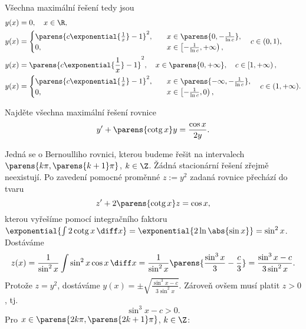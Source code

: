 \documentclass[answers]{exam}
\begin{document}
\begin{questions}
\begin{solution}
  	Všechna maximální řešení tedy jsou
  	\begin{align*}
  		y(x)
  		&=
  		0,
  		\quad x \in \R,
  		\\
  		y(x)
  		&=
  		\begin{cases}
  			\parens{c \exponential{\frac{1}{x}} - 1}^2, &\quad x \in \parens{0, -\frac{1}{\ln c}},
  			\\
  			0, &\quad x \in \left[ -\frac{1}{\ln c}, +\infty \right),
  		\end{cases}
  		\quad c \in (0, 1),
  		\\
  		y(x) 
  		&=
  		\parens{c \exponential{\frac{1}{x}} - 1}^2, \quad x \in \parens{0, +\infty}, \quad c \in \left[ 1, +\infty \right),
  		\\
  		y(x)
  		&=
  		\begin{cases}
  			\parens{c \exponential{\frac{1}{x}} - 1}^2, &\quad x \in \parens{-\infty, -\frac{1}{\ln c}},
  			\\
  			0, &\quad x \in \left[ -\frac{1}{\ln c}, 0 \right),
  		\end{cases}
  		\quad c \in (1, +\infty).
  	\end{align*} 
	\end{solution}
	
  \question
  Najd\v ete v\v sechna maxim\'aln\'i \v re\v sen\'i rovnice
  \begin{equation*}
    y' + \parens{\operatorname{cotg}x}y
    =
    \frac{\cos x}{2 y}.
  \end{equation*}
	    
  \begin{solution}
  	Jedná se o Bernoulliho rovnici, kterou budeme řešit na intervalech $\parens{k\pi, \parens{k+1}\pi}$, $k \in \Z$.  Žádná stacionární řešení zřejmě neexistují. Po zavedení pomocné proměnné $z:=y^2$ zadaná rovnice přechází do tvaru
	 	\begin{equation*}
	 		z'
	 		+
	 		2 \parens{\operatorname{cotg}x} z
	 		=
	 		\cos x,
	 	\end{equation*}
	 	kterou vyřešíme pomocí integračního faktoru $\exponential{\int 2 \operatorname{cotg}x \, \diff x} = \exponential{2 \ln \abs{\sin x}} = \sin^2 x$. Dostáváme
	 	\begin{equation*}
	 		z(x) 
	 		= 
	 		\frac{1}{\sin^2 x} \int \sin^2 x \cos x \, \diff x
	 		=
	 		\frac{1}{\sin^2 x} \parens{ \frac{\sin^3 x}{3} - \frac{c}{3}}
	 		=
	 		\frac{\sin^3 x - c}{3 \sin^2 x}.
	 	\end{equation*}
  	Protože $z = y^2$, dostáváme $y(x) = \pm \sqrt{\frac{\sin^3 x - c}{3 \sin^2 x}}$. Zároveň ovšem musí platit $z > 0$, tj.
  	\begin{equation}
  		\label{eq:3}
  		\sin^3 x - c > 0.
  	\end{equation}
  	Pro $x \in \parens{2k\pi, \parens{2k+1}\pi}$, $k \in \Z$:
  	

\end{solution}
\end{questions}
\end{document}
